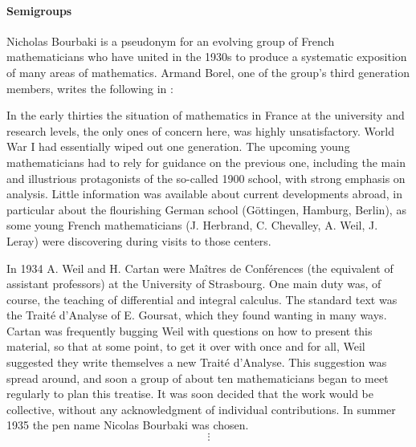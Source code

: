 \paragraph{Semigroups}

\begin{remark}\label{rem:bourbaki}
  Nicholas Bourbaki is a pseudonym for an evolving group of French mathematicians who have united in the 1930s to produce a systematic exposition of many areas of mathematics. Armand Borel, one of the group's third generation members, writes the following in \cite{Borel1998Bourbaki}:
  \begin{displayquote}
    In the early thirties the situation of mathematics in France at the university and research levels, the only ones of concern here, was highly unsatisfactory. World War I had essentially wiped out one generation. The upcoming young mathematicians had to rely for guidance on the previous one, including the main and illustrious protagonists of the so-called 1900 school, with strong emphasis on analysis. Little information was available about current developments abroad, in particular about the flourishing German school (Göttingen, Hamburg, Berlin), as some young French mathematicians (J. Herbrand, C. Chevalley, A. Weil, J. Leray) were discovering during visits to those centers.

    In 1934 A. Weil and H. Cartan were Ma\^itres de Conf\'erences (the equivalent of assistant professors) at the University of Strasbourg. One main duty was, of course, the teaching of differential and integral calculus. The standard text was the Trait\'e d'Analyse of E. Goursat, which they found wanting in many ways. Cartan was frequently bugging Weil with questions on how to present this material, so that at some point, to get it over with once and for all, Weil suggested they write themselves a new Trait\'e d'Analyse. This suggestion was spread around, and soon a group of about ten mathematicians began to meet regularly to plan this treatise. It was soon decided that the work would be collective, without any acknowledgment of individual contributions. In summer 1935 the pen name Nicolas Bourbaki was chosen.
    \begin{equation*}
      \vdots
    \end{equation*}


\end{displayquote}
\end{remark}
